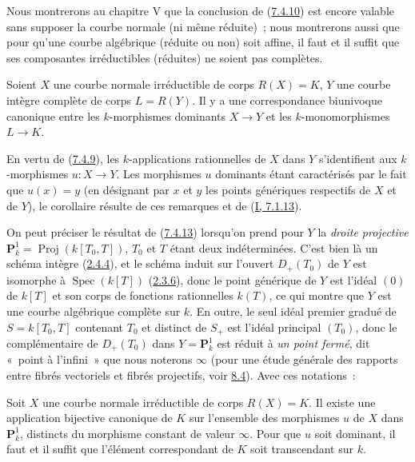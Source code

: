 
\begin{remark}[7.4.12]
\label{II.7.4.12-fr}
Nous montrerons au chapitre V que la conclusion de
(\hyperref[II.7.4.10-fr]{7.4.10}) est encore valable sans supposer la courbe
normale (ni même réduite)~; nous montrerons aussi que pour qu'une courbe
algébrique (réduite ou non) soit affine, il faut et il suffit que ses
composantes irréductibles (réduites) ne soient pas complètes.
\end{remark}

\begin{corollary}[7.4.13]
\label{II.7.4.13-fr}
Soient $X$ une courbe normale irréductible de corps $R(X)=K$, $Y$ une courbe
intègre complète de corps $L=R(Y)$. Il y a une correspondance biunivoque
canonique entre les $k$-morphismes dominants $X\to Y$ et les
$k$-monomorphismes $L\to K$.
\end{corollary}

En vertu de (\hyperref[II.7.4.9-fr]{7.4.9}), les $k$-applications rationnelles
de $X$ dans $Y$ s'identifient aux $k$-morphismes $u:X\to Y$. Les morphismes
$u$ dominants étant caractérisés par le fait que $u(x)=y$ (en désignant par
$x$ et $y$ les points génériques respectifs de $X$ et de $Y$), le corollaire
résulte de ces remarques et de (\hyperref[I.7.1.13-fr]{I, 7.1.13}).

\begin{env}[7.4.14]
\label{II.7.4.14-fr}
On peut préciser le résultat de (\hyperref[II.7.4.13-fr]{7.4.13}) lorsqu'on
prend pour $Y$ la \emph{droite projective}
$\mathbf{P}_k^1=\operatorname{Proj}(k[T_0,T])$, $T_0$ et $T$ étant deux
indéterminées. C'est bien là un schéma intègre
(\hyperref[II.2.4.4-fr]{2.4.4}), et le schéma induit sur l'ouvert $D_+(T_0)$
de $Y$ est isomorphe à $\operatorname{Spec}(k[T])$
(\hyperref[II.2.3.6-fr]{2.3.6}), donc le point générique de $Y$ est l'idéal
$(0)$ de $k[T]$ et son corps de fonctions rationnelles $k(T)$, ce qui montre
que $Y$ est une courbe algébrique complète sur $k$. En outre, le seul idéal
premier gradué de $S=k[T_0,T]$ contenant $T_0$ et distinct de $S_+$ est
l'idéal principal $(T_0)$, donc le complémentaire de $D_+(T_0)$ dans
$Y=\mathbf{P}_k^1$ est réduit à \emph{un point fermé}, dit «~point à
l'infini~» que nous noterons $\infty$ (pour une étude générale des rapports
entre fibrés vectoriels et fibrés projectifs, voir
\hyperref[subsection:II.8.4-fr]{8.4}). Avec ces notations~:
\end{env}

\begin{corollary}[7.4.15]
\label{II.7.4.15-fr}
Soit $X$ une courbe normale irréductible de corps $R(X)=K$. Il existe une
application bijective canonique de $K$ sur l'ensemble des morphismes $u$ de
$X$ dans $\mathbf{P}_k^1$, distincts du morphisme constant de valeur
$\infty$. Pour que $u$ soit dominant, il faut et il suffit que l'élément
correspondant de $K$ soit transcendant sur $k$.
\end{corollary}

